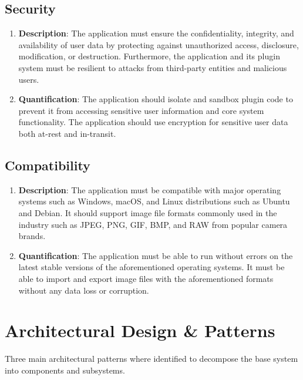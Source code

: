 \documentclass[11pt,a4paper]{article}
\begin{document}
\subsection{Security} 
\begin{enumerate}[label*=\arabic*.]
	\item[\textbullet] {\bf Description}: The application must ensure the
	confidentiality, integrity, and availability of user data by protecting
	against unauthorized access, disclosure, modification, or destruction.
	Furthermore, the application and its plugin system must be resilient to
	attacks from third-party entities and malicious users.

	\item[\textbullet] {\bf Quantification}: The application should isolate and
	sandbox plugin code to prevent it from accessing sensitive user information
	and core system functionality.  The application should use encryption for
	sensitive user data both at-rest and in-transit. 
\end{enumerate}

\subsection{Compatibility} 
\begin{enumerate}[label*=\arabic*.]
	\item[\textbullet] {\bf Description}: The application must be compatible
	with major operating systems such as Windows, macOS, and Linux distributions
	such as Ubuntu and Debian. It should support image file formats commonly
	used in the industry such as JPEG, PNG, GIF, BMP, and RAW from popular
	camera brands.

	\item[\textbullet] {\bf Quantification}: The application must be able to run
	without errors on the latest stable versions of the aforementioned operating
	systems. It must be able to import and export image files with the
	aforementioned formats without any data loss or corruption. 
\end{enumerate}

\section{Architectural Design \& Patterns}
Three main architectural patterns where identified to decompose the base system
into components and subsystems.
\end{document}
